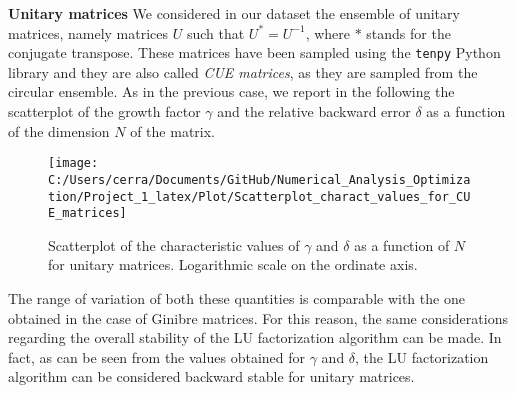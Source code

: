 \documentclass[a4paper,11pt]{article}
\begin{document}
\noindent \textbf{Unitary matrices } We considered in our dataset the ensemble of unitary matrices, namely matrices $U$ such that $U^{*} = U^{-1}$, where $*$ stands for the conjugate transpose. These matrices have been sampled using the \texttt{tenpy} Python library and they are also called \textit{CUE matrices}, as they are sampled from the circular ensemble. As in the previous case, we report in the following the scatterplot of the growth factor $\gamma$ and the relative backward error $\delta$ as a function of the dimension $N$ of the matrix.
\begin{figure}[H]
	\centering
	\texttt{[image: C:/Users/cerra/Documents/GitHub/Numerical\_Analysis\_Optimization/Project\_1\_latex/Plot/Scatterplot\_charact\_values\_for\_CUE\_matrices]}
	\caption{Scatterplot of the characteristic values of $\gamma$ and $\delta$ as a function of $N$ for unitary matrices. Logarithmic scale on the ordinate axis.}
	\label{fig:Scatterplot_CUE}
\end{figure}
\noindent  The range of variation of both these quantities is comparable with the one obtained in the case of Ginibre matrices. For this reason, the same considerations regarding the overall stability of the LU factorization algorithm can be made. In fact, as can be seen from the values obtained for $\gamma$ and $\delta$, the LU factorization algorithm can be considered backward stable for unitary matrices.\\
%
\end{document}

